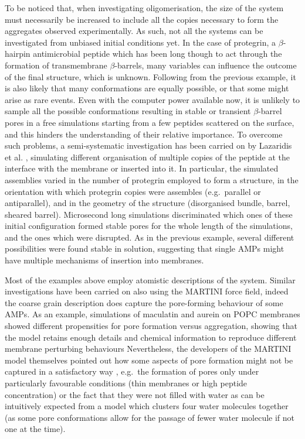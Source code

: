 To be noticed that, when investigating oligomerisation, the size of the system must necessarily be increased to include all the copies necessary to form the aggregates observed experimentally. As such, not all the systems can be investigated from unbiased initial conditions yet.
%
In the case of protegrin, a $\beta$-hairpin antimicrobial peptide which has been long though to act through the formation of transmembrane $\beta$-barrels, many variables can influence the outcome of the final structure, which is unknown. Following from the previous example, it is also likely that many conformations are equally possible, or that some might arise as rare events.
%
Even with the computer power available now, it is unlikely to sample all the possible conformations resulting in stable or transient $\beta$-barrel pores in a free simulations starting from a few peptides scattered on the surface, and this hinders the understanding of their relative importance.
%
To overcome such problems, a semi-systematic investigation has been carried on by Lazaridis et al. \cite{Lipkin2017}, simulating different organisation of multiple copies of the peptide at the interface with the membrane or inserted into it. In particular, the simulated assemblies varied in the number of protegrin employed to form a structure, in the orientation with which protegrin copies were assembles (e.g.\ parallel or antiparallel), and in the geometry of the structure (disorganised bundle, barrel, sheared barrel).
%
Microsecond long simulations discriminated which ones of these initial configuration formed stable pores for the whole length of the simulations, and the ones which were disrupted. As in the previous example, several different possibilities were found stable in solution, suggesting that single AMPs might have multiple mechanisms of insertion into membranes.

Most of the examples above employ atomistic descriptions of the system. Similar investigations have been carried on also using the MARTINI force field, indeed the coarse grain description does capture the pore-forming behaviour of some AMPs.
%
As an example, simulations of maculatin and aurein on POPC membranes showed different propensities for  pore formation versus aggregation, showing that the model retains enough details and chemical information to reproduce different membrane perturbing behaviours \cite{Balatti2017}
%
Nevertheless, the developers of the MARTINI model themselves pointed out how some aspects of pore formation might not be captured in a satisfactory way \cite{Marrink2013}, e.g.\ the formation of pores only under particularly favourable conditions (thin membranes or high peptide concentration) or the fact that they were not filled with water as can be intuitively expected from a model which clusters four water molecules together (as some pore conformations allow for the passage of fewer water molecule if not one at the time).

